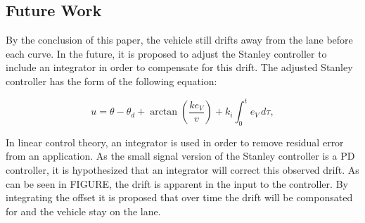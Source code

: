 \documentclass[arbeit=studie,oneside,BCOR=12mm]{ArbeitRST}
\begin{document}
\subsection{Future Work}

By the conclusion of this paper, the vehicle still drifts away from the
lane before each curve. In the future, it is proposed to adjust the Stanley
controller to include an integrator in order to compensate for this drift.
The adjusted Stanley controller has the form of the following equation:

\begin{equation} 
    u = \theta - \theta_d + \arctan\left(\frac{ke_{V}}{v}\right) + k_{i} \int_{0}^{t} e_{V}\,d\tau, 
    \label{eq:Stanley-Regler-adjusted} 
\end{equation}

In linear control theory, an integrator is used in order to remove residual
error from an application. As the small signal version of the Stanley
controller is a PD controller, it is hypothesized that an integrator will 
correct this observed drift. As can be seen in FIGURE, the drift is apparent in
the input to the controller. By integrating the offset it is proposed that
over time the drift will be componsated for and the vehicle stay on the lane. 
\end{document}

